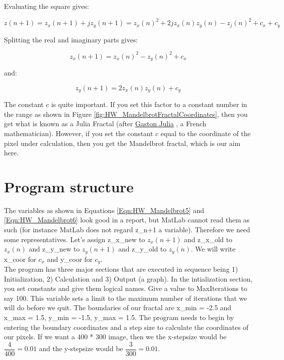 \documentclass[12pt,letterpaper]{article}
\begin{document}
Evaluating the square gives:

\begin{equation}\label{Eqn:HW_Mandelbrot54}
z(n+1) = z_x(n+1) + j z_y(n+1) = z_x(n)^2 + 2 j z_x(n) z_y(n) - z_j(n)^2 + c_x + c_y 
\end{equation}

Splitting the real and imaginary parts gives:

\begin{equation}\label{Eqn:HW_Mandelbrot5}
z_x(n+1) = z_x(n)^2 - z_y(n)^2 +c_x
\end{equation}

and:

\begin{equation}\label{Eqn:HW_Mandelbrot6}
z_y(n+1) = 2z_x(n) z_y(n) + c_y
\end{equation}

The constant $c$ is quite important. If you set this factor to a constant number in the range as shown in Figure \ref{fig:HW_MandelbrotFractalCoordinates}, then you get what is known as a Julia Fractal (after \href{http://en.wikipedia.org/wiki/Gaston_Julia}{Gaston Julia} , a French mathematician). However, if you set the constant $c$ equal to the coordinate of the pixel under calculation, then you get the Mandelbrot fractal, which is our aim here.\\

\section{Program structure}
The variables as shown in Equations \ref{Eqn:HW_Mandelbrot5} and \ref{Eqn:HW_Mandelbrot6} look good in a report, but MatLab cannot read them as such (for instance MatLab does not regard z\_n+1 a variable). Therefore we need some representatives. Let's assign z\_x\_new to $z_x(n+1)$ and z\_x\_old to $z_x(n)$ and z\_y\_new to $z_y(n+1)$ and z\_y\_old to $z_y(n)$. We will write x\_coor for $c_x$ and y\_coor for $c_y$.\\

The program has three major sections that are executed in sequence being 1) Initialization, 2) Calculation and 3) Output (a graph). In the intialization section, you set constants and give them logical names. 
Give a value to MaxIterations to say 100. This variable sets a limit to the maximum number of iterations that we will do before we quit. The boundaries of our fractal are x\_min = -2.5 and x\_max = 1.5, y\_min = -1.5, y\_max = 1.5. The program needs to begin by entering the boundary coordinates and a step size to calculate the coordinates of our pixels. If we want a 400 * 300 image, then we the x-stepsize would be $\dfrac{4}{400} = 0.01$ and the y-stepsize would be $\dfrac{3}{300} = 0.01$.\\
\end{document}
